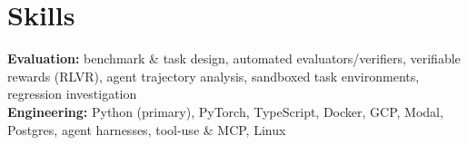 \documentclass[10pt, letterpaper]{article}
\begin{document}
\section{Skills}
\textbf{Evaluation:} benchmark \& task design, automated evaluators/verifiers, verifiable rewards (RLVR), agent trajectory analysis, sandboxed task environments, regression investigation\\[1pt]
\textbf{Engineering:} Python (primary), PyTorch, TypeScript, Docker, GCP, Modal, Postgres, agent harnesses, tool-use \& MCP, Linux
\end{document}
